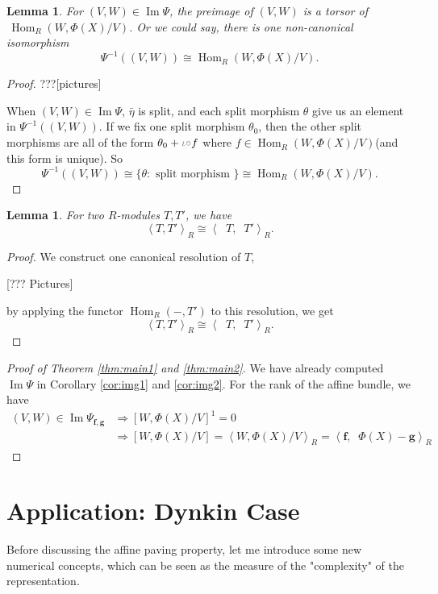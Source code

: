 \documentclass[reqno,11pt]{amsart}
\numberwithin{equation}{section}
\theoremstyle{plain}
\newtheorem{lemma}[theorem]{Lemma}
\theoremstyle{plain}
\numberwithin{equation}{section}
\theoremstyle{remark}
\DeclareMathOperator{\Img}{\operatorname{Im}}
\DeclareMathOperator{\Hom}{\operatorname{Hom}}
\DeclareMathOperator{\dimv}{\operatorname{\underline{\mathbf{dim}}}}
\newcommand{\dimvec}[1]{\mathbf{#1}}
\begin{document}
\begin{lemma}
	For $(V,W) \in \Img \Psi$, the preimage of $(V,W)$ is a torsor of $\,\Hom_{R}(W,\Phi(X)/V)$. Or we could say, there is one non-canonical isomorphism
	$$\Psi^{-1}((V,W)) \cong \Hom_{R}(W,\Phi(X)/V).$$
\end{lemma}
\begin{proof}
???[pictures]

When $(V,W) \in \Img \Psi$, $\bar{\eta}$ is split, and each split morphism $\theta$ give us an element in $\Psi^{-1}((V,W))$. If we fix one split morphism $\theta_0$, then the other split morphisms are all of the form $\theta_0 + \textcolor{gray}{\iota \circ} f$ where $f \in \Hom_{R}(W,\Phi(X)/V)$(and this form is unique). So
$$\Psi^{-1}((V,W)) \cong \{ \theta: \text{ split morphism } \} \cong \Hom_{R}(W,\Phi(X)/V).$$
\end{proof}
\begin{lemma}
	For two $R$-modules $T,T'$, we have
	$$	\left< T,T'\right>_R \cong 	\left< \dimv T,\dimv T'\right>_R.$$
\end{lemma}
\begin{proof}
We construct one canonical resolution of $T$,

[??? Pictures]

by applying the functor $\Hom_R(-,T')$ to this resolution, we get
$$	\left< T,T'\right>_R \cong 	\left< \dimv T,\dimv T'\right>_R.$$
\end{proof}
\begin{proof}[{Proof of Theorem \ref{thm:main1} and \ref{thm:main2}}]
We have already computed $\Img \Psi$ in Corollary \ref{cor:img1} and \ref{cor:img2}. For the rank of the affine bundle, we have 
\begin{equation*}
\begin{aligned}
(V,W) \in \Img \Psi_{\dimvec{f},\dimvec{g}} &\Longrightarrow [W,\Phi(X)/V]^1=0\\
& \Longrightarrow [W,\Phi(X)/V]=\left< W,\Phi(X)/V\right>_R=\left< \dimvec{f},\dimv \Phi(X)-\dimvec{g}\right>_R
\end{aligned}
\end{equation*}
\end{proof}

\section{Application: Dynkin Case}
Before discussing the affine paving property, let me introduce some new numerical concepts, which can be seen as the measure of the "complexity" of the representation.
\end{document}
